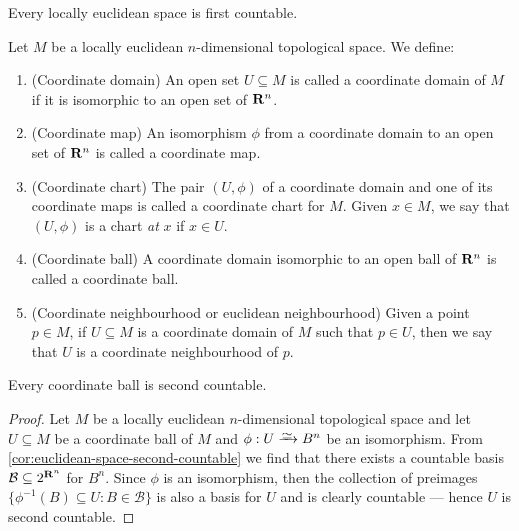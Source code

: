 \begin{proposition}
    \label{prop:locally-euclidean-first-countable}
    Every locally euclidean space is first countable.
\end{proposition}


\begin{definition}[Miscellaneous]
    Let \(M\) be a locally euclidean \(n\)-dimensional topological space. We
    define:
    \begin{enumerate}[(C1)]
        \item\label{def: coordinate domain}
        (Coordinate domain) An open set \(U \subseteq M\) is called a coordinate
        domain of \(M\) if it is isomorphic to an open set of \(\mathbf{R}^n\).
        \item\label{def: coordinate map}
        (Coordinate map) An isomorphism \(\phi\) from a coordinate domain to an
        open set of \(\mathbf{R}^n\) is called a coordinate map.
        \item\label{def: coordinate chart}
        (Coordinate chart) The pair \((U, \phi)\) of a coordinate domain and one
        of its coordinate maps is called a coordinate chart for \(M\). Given \(x \in
        M\), we say that \((U, \phi)\) is a chart \emph{at} \(x\) if \(x \in U\).
        \item\label{def: coordinate ball}
        (Coordinate ball) A coordinate domain isomorphic to an open ball of
        \(\mathbf{R}^n\) is called a coordinate ball.
        \item\label{def: euclidean neighbourhood}
        (Coordinate neighbourhood or euclidean neighbourhood) Given a point \(p
        \in M\), if \(U \subseteq M\) is a coordinate domain of \(M\) such that
        \(p \in U\), then we say that \(U\) is a coordinate neighbourhood of
        \(p\).
    \end{enumerate}
\end{definition}

\begin{proposition}
    \label{prop:coordinate-ball-second-countable}
    Every coordinate ball is second countable.
\end{proposition}

\begin{proof}
    Let \(M\) be a locally euclidean \(n\)-dimensional topological space and let
    \(U \subseteq M\) be a coordinate ball of \(M\) and \(\phi: U \isoto B^n\) be an
    isomorphism. From \cref{cor:euclidean-space-second-countable} we find that there
    exists a countable basis \(\mathcal B \subseteq 2^{\mathbf{R}^n}\) for \(B^n\). Since
    \(\phi\) is an isomorphism, then the collection of preimages \(\{\phi^{-1}(B)
    \subseteq U \colon B \in \mathcal B\}\) is also a basis for \(U\) and is clearly
    countable --- hence \(U\) is second countable.
\end{proof}

